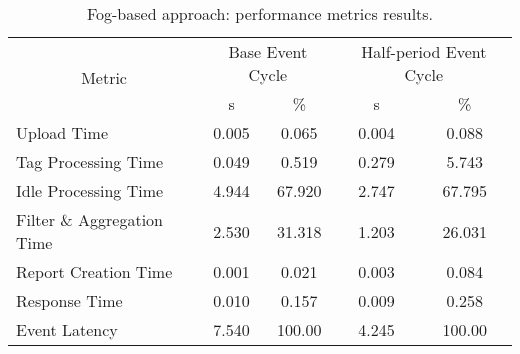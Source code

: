 \begin{table}[ht!]
\centering
\caption{Fog-based approach: performance metrics results.}
\label{table:fog_metrics}
\begin{tabular}{|l|c|c|c|c|}
\hline
\multicolumn{1}{|c|}{\multirow{2}{*}{Metric}} & \multicolumn{2}{c|}{Base Event Cycle} & \multicolumn{2}{c|}{Half-period Event Cycle} \\
\multicolumn{1}{|c|}{}                        & s                 & \%                & s                    & \%                    \\ \hline
Upload Time                                   & 0.005             & 0.065             & 0.004                & 0.088                 \\ \hline
Tag Processing Time                           & 0.049             & 0.519             & 0.279                & 5.743                 \\ \hline
Idle Processing Time                          & 4.944             & 67.920            & 2.747                & 67.795                \\ \hline
Filter \& Aggregation Time                    & 2.530             & 31.318            & 1.203                & 26.031                \\ \hline
Report Creation Time                          & 0.001             & 0.021             & 0.003                & 0.084                 \\ \hline
Response Time                                 & 0.010             & 0.157             & 0.009                & 0.258                 \\ \hline
Event Latency                                 & 7.540             & 100.00            & 4.245                & 100.00                \\ \hline
\end{tabular}
\end{table}
